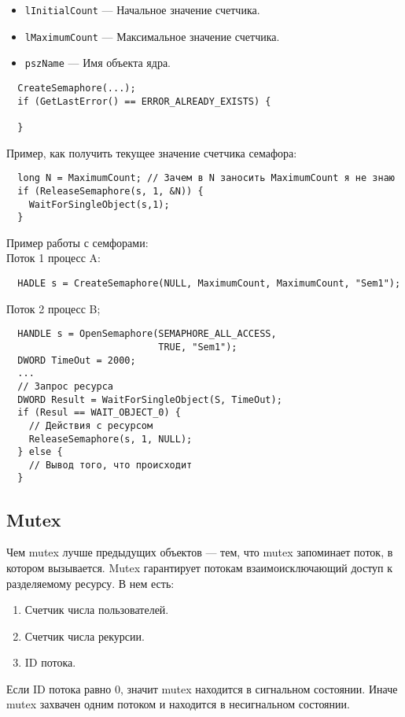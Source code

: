 \begin{itemize}
  \item \verb!lInitialCount! --- Начальное значение счетчика.
  \item \verb!lMaximumCount! --- Максимальное значение счетчика.
  \item \verb!pszName! --- Имя объекта ядра.
\end{itemize}

\begin{verbatim}
  CreateSemaphore(...);
  if (GetLastError() == ERROR_ALREADY_EXISTS) {
    
  }
\end{verbatim}

Пример, как получить текущее значение счетчика семафора:
\begin{verbatim}
  long N = MaximumCount; // Зачем в N заносить MaximumCount я не знаю
  if (ReleaseSemaphore(s, 1, &N)) {
    WaitForSingleObject(s,1);
  }
\end{verbatim}

Пример работы с семфорами:\\
Поток 1 процесс A:
\begin{verbatim}
  HADLE s = CreateSemaphore(NULL, MaximumCount, MaximumCount, "Sem1");
\end{verbatim}
Поток 2 процесс B;
\begin{verbatim}
  HANDLE s = OpenSemaphore(SEMAPHORE_ALL_ACCESS,
                           TRUE, "Sem1");
  DWORD TimeOut = 2000;
  ...
  // Запрос ресурса 
  DWORD Result = WaitForSingleObject(S, TimeOut);
  if (Resul == WAIT_OBJECT_0) {
    // Действия с ресурсом
    ReleaseSemaphore(s, 1, NULL);
  } else {
    // Вывод того, что происходит
  }
\end{verbatim}

\subsection{Mutex}
Чем mutex лучше предыдущих объектов --- тем, что mutex запоминает поток, в
котором вызывается. Mutex гарантирует потокам взаимоисключающий доступ к
разделяемому ресурсу. В нем есть:
\begin{enumerate}
  \item Счетчик числа пользователей.
  \item Счетчик числа рекурсии.
  \item ID потока.
\end{enumerate}

Если ID потока равно 0, значит mutex находится в сигнальном состоянии. Иначе
mutex захвачен одним потоком и находится в несигнальном состоянии.

